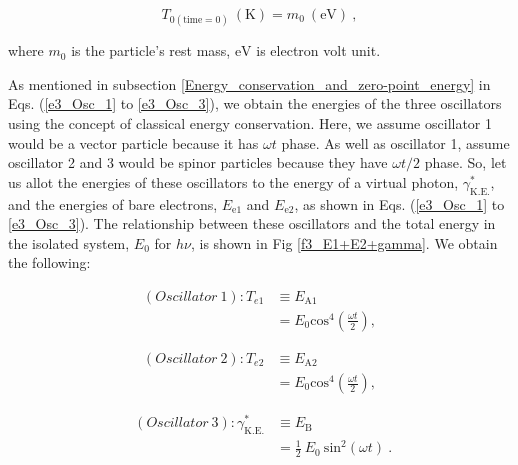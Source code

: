 \documentclass[%
 reprint,
 amsmath,amssymb,
 aps,
]{revtex4-1}
\numberwithin{equation}{section}%
\begin{document}
        \begin{equation}
            T_{\mathrm{0(time=0)}} \ (\mathrm{K}) = m_{0} \ (\mathrm{eV})
            \ ,
        \end{equation}

    \noindent
    where $m_{0}$ is the particle's rest mass, $\mathrm{eV}$ is electron volt unit.

    As mentioned in subsection \ref{Energy_conservation_and_zero-point_energy} in Eqs. (\ref{e3_Osc_1} to \ref{e3_Osc_3}), we obtain the energies of the three oscillators using the concept of classical energy conservation. Here, we assume oscillator 1 would be a vector particle because it has $\omega t$ phase. As well as oscillator 1, assume oscillator 2 and 3 would be spinor particles because they have $\omega t / 2$ phase. So, let us allot the energies of these oscillators to the energy of a virtual photon, $\gamma^{*}_\mathrm{K.E.}$, and the energies of bare electrons, $E_\mathrm{e1}$ and $E_\mathrm{e2}$, as shown in Eqs. (\ref{e3_Osc_1} to \ref{e3_Osc_3}). The relationship between these oscillators and the total energy in the isolated system, $E_\mathrm{0}$ for $h \nu$, is shown in Fig \ref{f3_E1+E2+gamma}. We obtain the following:

        \begin{equation}
            \begin{split}
                (Oscillator \ 1): T_{e1} 
                    & \equiv E_{\mathrm{A1}} \\
                    &= E_{0} \mathrm{cos}^{4} \left( \frac{\omega t}{2} \right)
                    ,
                \label{e3_Osc_1_PE}
            \end{split}
        \end{equation}

        \begin{equation}
            \begin{split}
                (Oscillator \ 2): T_{e2} 
                    & \equiv E_{\mathrm{A2}} \\
                    &= E_{0} \mathrm{cos}^{4} \left( \frac{\omega t}{2} \right)
                    ,
                \label{e3_Osc_2_PE}
            \end{split}
        \end{equation}

        \begin{equation}
            \begin{split}
                \ \ (Oscillator \ 3):  \gamma^{*}_\mathrm{K.E.}
                    & \equiv E_{\mathrm{B}} \\
                    &= \frac{1}{2} \ E_{0} \ \mathrm{sin}^{2} (\omega t)
                    \ .
                \label{e3_Osc_3_KE}  
            \end{split}
        \end{equation}
\end{document}

